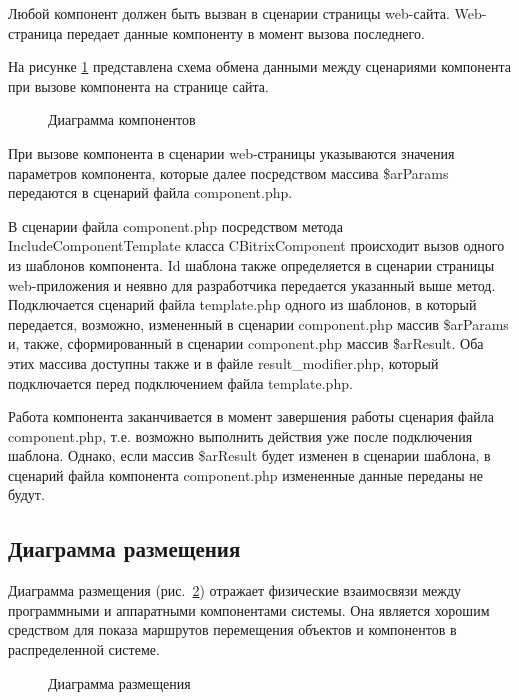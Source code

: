 Любой компонент должен быть вызван в сценарии страницы web-сайта. Web-страница передает данные компоненту в момент вызова последнего.

На рисунке \ref{data:image} представлена схема обмена данными между сценариями компонента при вызове компонента на странице сайта.

\begin{figure}[H]
\caption{Диаграмма компонентов}
\label{data:image}
\end{figure}

При вызове компонента в сценарии web-страницы указываются значения параметров компонента, которые далее посредством массива \$arParams передаются в сценарий файла component.php.

В сценарии файла component.php посредством метода \linebreak IncludeComponentTemplate класса CBitrixComponent происходит вызов одного из шаблонов компонента. Id шаблона также определяется в сценарии страницы web-приложения и неявно для разработчика передается указанный выше метод. Подключается сценарий файла template.php одного из шаблонов, в который передается, возможно, измененный в сценарии component.php массив \$arParams и, также, сформированный в сценарии component.php массив \$arResult. Оба этих массива доступны также и в файле result\_modifier.php, который подключается перед подключением файла template.php. 

Работа компонента заканчивается в момент завершения работы сценария файла component.php, т.е. возможно выполнить действия уже после подключения шаблона. Однако, если массив \$arResult будет изменен в сценарии шаблона, в сценарий файла компонента component.php измененные данные переданы не будут.

\subsection{Диаграмма размещения}

Диаграмма размещения (рис.~\ref{place:image}) отражает физические взаимосвязи между программными и аппаратными компонентами системы. Она является хорошим средством для показа маршрутов перемещения объектов и компонентов в распределенной системе.

\begin{figure}[H]
\caption{Диаграмма размещения}
\label{place:image}
\end{figure}

